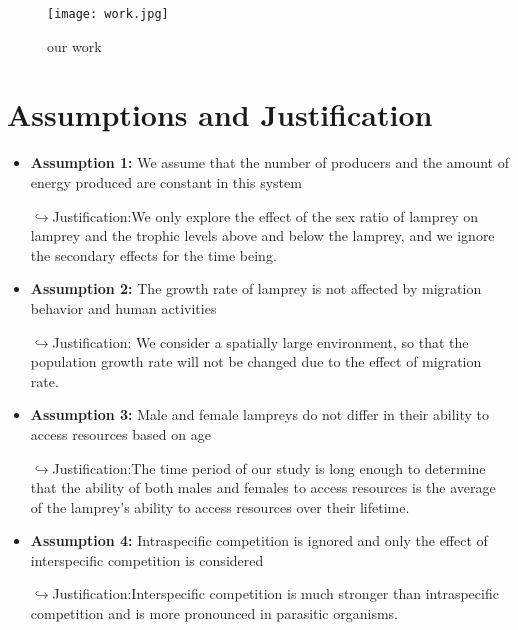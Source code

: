 \documentclass[12pt]{article}  %
\begin{document}
\begin{figure}[!htbp]
	\centering
	\texttt{[image: work.jpg]}
	\caption{our work}\label{work}
\end{figure}

\section{Assumptions and Justification}
\begin{itemize}
	\item \textbf{Assumption 1:}
	We assume that the number of producers and the amount of energy produced are constant in this system
	
	$\hookrightarrow$Justification:We only explore the effect of the sex ratio of lamprey on lamprey and the trophic levels above and below the lamprey, and we ignore the secondary effects for the time being.\cite{1}
	\item \textbf{Assumption 2:}
	The growth rate of lamprey is not affected by migration behavior and human activities
	
	$\hookrightarrow$Justification: We consider a spatially large environment, so that the population growth rate will not be changed due to the effect of migration rate.\cite{2}
	\item \textbf{Assumption 3:}
	Male and female lampreys do not differ in their ability to access resources based on age
	
	$\hookrightarrow$Justification:The time period of our study is long enough to determine that the ability of both males and females to access resources is the average of the lamprey's ability to access resources over their lifetime.\cite{3}
	\item \textbf{Assumption 4:}
	Intraspecific competition is ignored and only the effect of interspecific competition is considered
	
	$\hookrightarrow$Justification:Interspecific competition is much stronger than intraspecific competition and is more pronounced in parasitic organisms.\cite{3}

\end{itemize}
\end{document}
